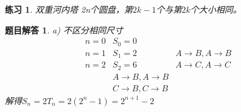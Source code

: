 \documentclass[mode=geye]{elegantnote}
\newtheorem{exercise}{练习}
\newtheorem{answer}{题目解答}
\begin{document}
\begin{exercise}
	双重河内塔 2n个圆盘，第$ 2k-1 $个与第$ 2k $个大小相同。
\end{exercise}

\begin{answer}
	a) 不区分相同尺寸
	\begin{equation*}
		\begin{aligned}
			n=0 & S_0=0	& \\
			n=1 & S_1=2	& A \rightarrow B, A \rightarrow B\\
			n=2 & S_2=6	& A \rightarrow C, A \rightarrow C\\
						& A \rightarrow B, A \rightarrow B\\
						& C \rightarrow B, C \rightarrow B
		\end{aligned}
	\end{equation*}
	解得$ S_n = 2T_n = 2(2^n-1)=2^{n+1}-2 $
	

\end{answer}
\end{document}
